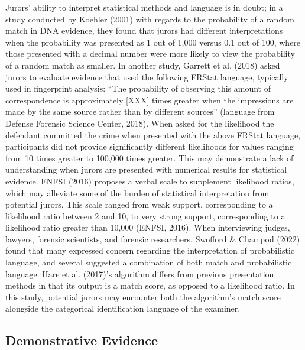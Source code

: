 \documentclass[print]{nuthesis}
\begin{document}
Jurors' ability to interpret statistical methods and language is in doubt; in a study conducted by Koehler (2001) with regards to the probability of a random match in DNA evidence, they found that jurors had different interpretations when the probability was presented as 1 out of 1,000 versus 0.1 out of 100, where those presented with a decimal number were more likely to view the probability of a random match as smaller.
In another study, Garrett et al. (2018) asked jurors to evaluate evidence that used the following FRStat language, typically used in fingerprint analysis: ``The probability of observing this amount of correspondence is approximately {[}XXX{]} times greater when the impressions are made by the same source rather than by different sources'' (language from Defense Forensic Science Center, 2018).
When asked for the likelihood the defendant committed the crime when presented with the above FRStat language, participants did not provide significantly different likelihoods for values ranging from 10 times greater to 100,000 times greater.
This may demonstrate a lack of understanding when jurors are presented with numerical results for statistical evidence.
ENFSI (2016) proposes a verbal scale to supplement likelihood ratios, which may alleviate some of the burden of statistical interpretation from potential jurors.
This scale ranged from weak support, corresponding to a likelihood ratio between 2 and 10, to very strong support, corresponding to a likelihood ratio greater than 10,000 (ENFSI, 2016).
When interviewing judges, lawyers, forensic scientists, and forensic researchers, Swofford \& Champod (2022) found that many expressed concern regarding the interpretation of probabilistic language, and several suggested a combination of both match and probabilistic language.
Hare et al. (2017)'s algorithm differs from previous presentation methods in that its output is a match score, as opposed to a likelihood ratio.
In this study, potential jurors may encounter both the algorithm's match score alongside the categorical identification language of the examiner.

\hypertarget{demonstrative-evidence-1}{%
\subsection{Demonstrative Evidence}\label{demonstrative-evidence-1}}
\end{document}

